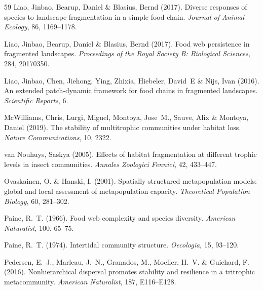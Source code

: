 \documentclass[11pt]{article}
\begin{document}
\begin{thebibliography}{59}
Liao, Jinbao, Bearup, Daniel \& Blasius, Bernd (2017{}).
\newblock Diverse responses of species to landscape fragmentation in a simple
  food chain.
\newblock \emph{Journal of Animal Ecology}, 86, 1169--1178.

Liao, Jinbao, Bearup, Daniel \& Blasius, Bernd (2017{}).
\newblock Food web persistence in fragmented landscapes.
\newblock \emph{Proceedings of the Royal Society B: Biological Sciences}, 284,
  20170350.

Liao, Jinbao, Chen, Jiehong, Ying, Zhixia, Hiebeler, David~E \& Nijs, Ivan
  (2016).
\newblock An extended patch-dynamic framework for food chains in fragmented
  landscapes.
\newblock \emph{Scientific Reports}, 6.

McWilliams, Chris, Lurgi, Miguel, Montoya, Jose~M., Sauve, Alix \& Montoya,
  Daniel (2019).
\newblock The stability of multitrophic communities under habitat loss.
\newblock \emph{Nature Communications}, 10, 2322.

van Nouhuys, Saskya (2005).
\newblock Effects of habitat fragmentation at different trophic levels in
  insect communities.
\newblock \emph{Annales Zoologici Fennici}, 42, 433--447.

Ovaskainen, O. \& Hanski, I. (2001).
\newblock Spatially structured metapopulation models: global and local
  assessment of metapopulation capacity.
\newblock \emph{Theoretical Population Biology}, 60, 281--302.

Paine, R.~T. (1966).
\newblock Food web complexity and species diversity.
\newblock \emph{American Naturalist}, 100, 65--75.

Paine, R.~T. (1974).
\newblock Intertidal community structure.
\newblock \emph{Oecologia}, 15, 93--120.

Pedersen, E.~J., Marleau, J.~N., Granados, M., Moeller, H.~V. \& Guichard, F.
  (2016).
\newblock Nonhierarchical dispersal promotes stability and resilience in a
  tritrophic metacommunity.
\newblock \emph{American Naturalist}, 187, E116--E128.


\end{thebibliography}
\end{document}
